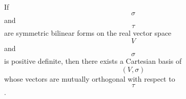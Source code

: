If $$\sigma$$ and $$\tau$$ are symmetric bilinear forms on the real vector space $$V$$ and $$\sigma$$ is positive definite, then there exists a Cartesian basis of $$(V, \sigma)$$ whose vectors are mutually orthogonal with respect to $$\tau$$.

